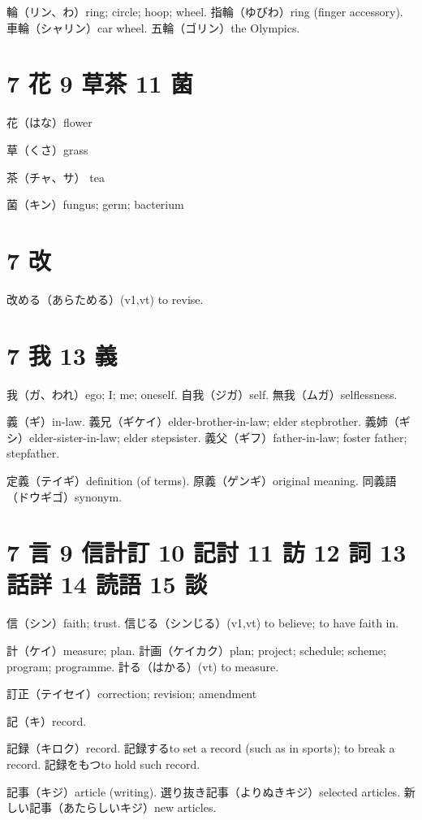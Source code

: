 輪（リン、わ）ring; circle; hoop; wheel.
指輪（ゆびわ）ring (finger accessory).
車輪（シャリン）car wheel.
五輪（ゴリン）the Olympics.

\section{7 花 9 草茶 11 菌}

花（はな）flower

草（くさ）grass

茶（チャ、サ） tea

菌（キン）fungus; germ; bacterium

\section{7 改}

改める（あらためる）(v1,vt) to revise.

\section{7 我 13 義}

我（ガ、われ）ego; I; me; oneself.
自我（ジガ）self.
無我（ムガ）selflessness.

義（ギ）in-law.
義兄（ギケイ）elder-brother-in-law; elder stepbrother.
義姉（ギシ）elder-sister-in-law; elder stepsister.
義父（ギフ）father-in-law; foster father; stepfather.

定義（テイギ）definition (of terms).
原義（ゲンギ）original meaning.
同義語（ドウギゴ）synonym.

\section{7 言 9 信計訂 10 記討 11 訪 12 詞 13 話詳 14 読語 15 談}

信（シン）faith; trust.
信じる（シンじる）(v1,vt) to believe; to have faith in.

計（ケイ）measure; plan.
計画（ケイカク）plan; project; schedule; scheme; program; programme.
計る（はかる）(vt) to measure.

訂正（テイセイ）correction; revision; amendment

記（キ）record.

記録（キロク）record.
記録するto set a record (such as in sports); to break a record.
記録をもつto hold such record.

記事（キジ）article (writing).
選り抜き記事（よりぬきキジ）selected articles.
新しい記事（あたらしいキジ）new articles.

